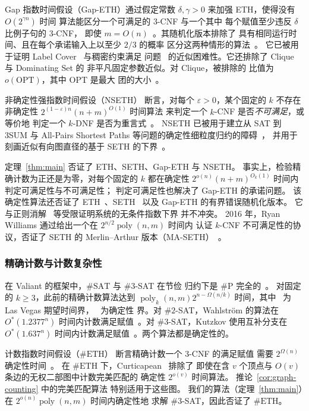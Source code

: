 \documentclass[11pt,reqno]{amsart}
\numberwithin{equation}{section}
\theoremstyle{definition}\newtheorem{definition}[theorem]{定义}
\theoremstyle{remark}\newtheorem{remark}[theorem]{注}
\newcommand{\poly}{\operatorname{poly}}
\renewcommand{\ge}{\geqslant}
\begin{document}
Gap 指数时间假设（Gap-ETH）通过假定常数 $\delta,\gamma>0$
来加强 ETH，使得没有 $O(2^{\gamma n})$ 时间
算法能区分一个可满足的 $3$-CNF 与一个其中
每个赋值至少违反 $\delta$ 比例子句的 $3$-CNF，
即使 $m=O(n)$~\cite{Din16,MR17}。其随机化版本排除了
具有相同运行时间、且在每个承诺输入上以至少 $2/3$ 的概率
区分这两种情形的算法~\cite[猜想~2.5]{CCK20}。
它已被用于证明 Label Cover~\cite{Din16} 与稠密约束满足
问题~\cite{MR17} 的近似困难性。它还排除了 Clique 与 Dominating Set 的
非平凡固定参数近似。对 Clique，被排除的
比值为 $o(\mathrm{OPT})$，其中 $\mathrm{OPT}$ 是最大
团的大小~\cite[推论~5.3 与~5.6]{CCK20}。

非确定性强指数时间假设（NSETH）
断言，对每个 $\varepsilon>0$，某个固定的 $k$ 不存在
非确定性 $2^{(1-\varepsilon)n}(n+m)^{O(1)}$ 时间算法
来判定一个 $k$-CNF 是否\emph{不可满足}，或等价地
判定一个 $k$-DNF 是否为重言式~\cite{CGIMPS16}。
NSETH 已被用于建立从 SAT 到 3SUM 与 All-Pairs Shortest
Paths 等问题的确定性细粒度归约的障碍~\cite{CGIMPS16}，
并用于刻画近似有向图直径的基于 SETH 的下界~\cite{Li21}。

定理~\ref{thm:main} 否证了 ETH、SETH、Gap-ETH 与 NSETH。
事实上，检验精确计数为正还是为零，对每个固定的 $k$ 都在确定性
$2^{o(n)}(n+m)^{O_k(1)}$ 时间内判定可满足性与不可满足性；
判定可满足性也解决了 Gap-ETH 的承诺问题。
该确定性算法还否证了 ETH~\cite[第~1 节]{DHMTW}、SETH~\cite[定义~2.1]{CDL16}
以及 Gap-ETH 的有界错误随机化版本。
它与正则消解~\cite{BeckImp13} 等受限证明系统的无条件指数下界
并不冲突。
2016 年，Ryan Williams 通过给出一个在 $2^{n/2}\poly(n,m)$ 时间内
认证 $k$-CNF 不可满足性的协议，否证了 SETH 的
Merlin--Arthur 版本（MA-SETH）~\cite[定理~3.3]{Wil16}。

\subsubsection{精确计数与计数复杂性}\label{subsec:related-counting}
在 Valiant 的框架中，$\#\mathrm{SAT}$ 与 $\#3$-SAT 在节俭
归约下是 $\#\mathrm P$ 完全的~\cite[第~3 节，事实~1--2]{Val79}。
对固定的 $k\ge3$，此前的精确计数算法达到
$\poly_k(n,m)2^{n-\Omega(n/k)}$ 时间，其中~\cite[引理~3.5]{IMP12} 为 Las Vegas
期望时间界，~\cite[定理~1.6]{CW21} 为确定性
界。对 $\#2$-SAT，Wahlstr\"om 的算法在
$O^*(1.2377^n)$ 时间内计数满足赋值~\cite{Wahlstrom08}。对 $\#3$-SAT，Kutzkov
使用互补分支在 $O^*(1.637^n)$ 时间内计数满足赋值~\cite{Kutzkov26}。两个算法都是确定性的。

计数指数时间假设（$\#\mathrm{ETH}$）
断言精确计数一个 $3$-CNF 的满足赋值
需要 $2^{\Omega(n)}$ 确定性时间~\cite[第~1 节]{DHMTW}。
在 $\#\mathrm{ETH}$ 下，Curticapean~\cite{Cur18} 排除了
即使在含 $v$ 个顶点与 $O(v)$ 条边的无权二部图中计数完美匹配的
确定性 $2^{o(v)}$ 时间算法。
推论~\ref{cor:graph-counting} 中的完美匹配算法
特别适用于这些图。
我们的算法（定理~\ref{thm:main}）在 $2^{o(n)}\poly(n,m)$ 时间内确定性地
求解 $\#3$-SAT，因此否证了 $\#\mathrm{ETH}$。
\end{document}
